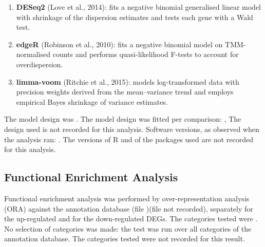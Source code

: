 \begin{enumerate}
  \item \textbf{DESeq2} (Love et al., 2014): fits a negative binomial generalised linear model with shrinkage of the dispersion estimates and tests each gene with a Wald test.
  \item \textbf{edgeR} (Robinson et al., 2010): fits a negative binomial model on TMM-normalised counts and performs quasi-likelihood F-tests to account for overdispersion.
  \item \textbf{limma-voom} (Ritchie et al., 2015): models log-transformed data with precision weights derived from the mean--variance trend and employs empirical Bayes shrinkage of variance estimates.
\end{enumerate}

The model design was .
The model design was fitted per comparison:
, 
The design used is not recorded for this analysis.
Software versions, as observed when the analysis ran:  .
The versions of R and of the packages used are not recorded for this analysis.

\subsection{Functional Enrichment Analysis}

Functional enrichment analysis was performed by over-representation analysis (ORA) against the annotation database (file \texttt{})(file not recorded), separately for the up-regulated and for the down-regulated DEGs.
The categories tested were .
No selection of categories was made: the test was run over all categories of the annotation database.
The categories tested were not recorded for this result.


